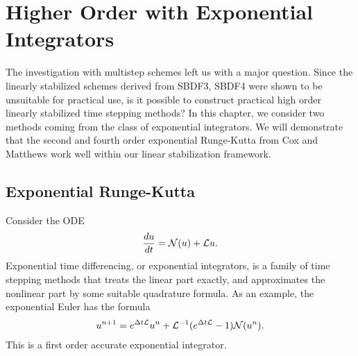 \chapter{Higher Order with Exponential Integrators}
The investigation with multistep schemes left us with a major question. Since the linearly stabilized schemes derived from SBDF3, SBDF4 were shown to be unsuitable for practical use, is it possible to construct practical high order linearly stabilized time stepping methods? In this chapter, we consider two methods coming from the class of exponential integrators. We will demonstrate that the second and fourth order exponential Runge-Kutta from Cox and Matthews \cite{cox2002exponential} work well within our linear stabilization framework.

\section{Exponential Runge-Kutta}
\label{sect:exp rk}
Consider the ODE
\begin{align}
\frac{du}{dt} = \mathcal{N}(u) + \mathcal{L} u.
\end{align}
Exponential time differencing, or exponential integrators, is a family of time stepping methods that treats the linear part exactly, and approximates the nonlinear part by some suitable quadrature formula. As an example, the exponential Euler has the formula
\begin{align}
u^{n+1} 
= e^{\Delta t\mathcal{L}} u^n + \mathcal{L}^{-1}(e^{\Delta t\mathcal{L}}  -1) \mathcal{N}(u^n).
\end{align}
This is a first order accurate exponential integrator. 
 
